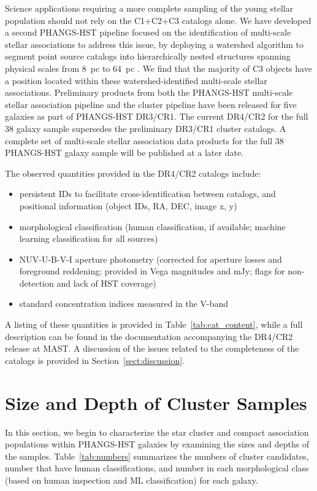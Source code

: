 \documentclass[]{aastex631}
\begin{document}
Science applications requiring a more complete sampling of the young stellar population should not rely on the C1+C2+C3 catalogs alone.  We have developed a second PHANGS-HST pipeline focused on the identification of multi-scale stellar associations to address this issue, by deploying a watershed algorithm to segment point source catalogs into hierarchically nested structures spanning physical scales from 8~pc to 64~pc \citep{larson_multiscale_2023}.  We find that the majority of C3 objects have a position located within these watershed-identified multi-scale stellar associations. Preliminary products from both the PHANGS-HST multi-scale stellar association pipeline and the cluster pipeline have been released for five galaxies as part of PHANGS-HST DR3/CR1.  The current DR4/CR2 for the full 38 galaxy sample supersedes the preliminary DR3/CR1 cluster catalogs.  A complete set of multi-scale stellar association data products for the full 38 PHANGS-HST galaxy sample will be published at a later date. 

The observed quantities provided in the DR4/CR2 catalogs include:
\begin{itemize}
\item persistent IDs to facilitate cross-identification between catalogs, and positional information (object IDs, RA, DEC, image x, y)
\item morphological classification (human classification, if available; machine learning classification for all sources)
\item NUV-U-B-V-I aperture photometry (corrected for aperture losses and foreground reddening; provided in Vega magnitudes and mJy; flags for non-detection and lack of HST coverage)
\item standard concentration indices measured in the V-band
\end{itemize}

A listing of these quantities is provided in Table~\ref{tab:cat_content}, while a full description can be found in the documentation accompanying the DR4/CR2 release at MAST. A discussion of the issues related to the completeness of the catalogs is provided in Section~\ref{sect:discussion}.
%

%
\section{Size and Depth of Cluster Samples}\label{sect:catalog_properties}
%

%
In this section, we begin to characterize the star cluster and compact association populations within PHANGS-HST galaxies by examining the sizes and depths of the samples.  Table~\ref{tab:numbers} summarizes the numbers of cluster candidates, number that have human classifications, and number in each morphological class (based on human inspection and ML classification) for each galaxy.
\end{document}
